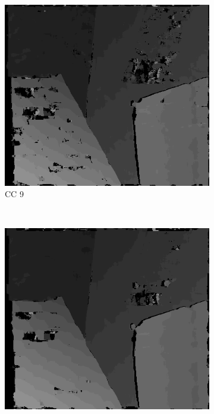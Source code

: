 \begin{figure}
  \begin{subfigure}[b]{0.23\textwidth}
    \centering
    \includegraphics[width=\textwidth]{images/stereo-pairs/venus_dual_crosschecked_9.png}
    \caption{CC 9}
  \end{subfigure}
  ~
  \begin{subfigure}[b]{0.23\textwidth}
    \centering
    \includegraphics[width=\textwidth]{images/stereo-pairs/venus_dual_crosschecked_13.png}

\end{subfigure}
\end{figure}
